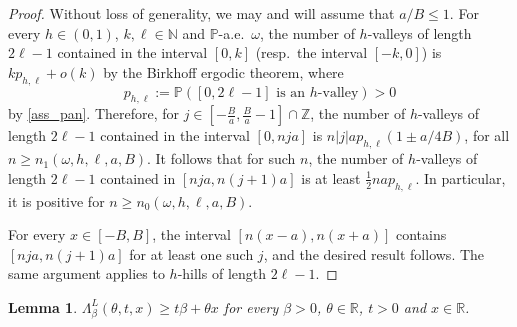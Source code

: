 \documentclass[a4paper]{amsart}
\numberwithin{equation}{section}
\theoremstyle{plain}
\newtheorem{lemma}[theorem]{\sc Lemma}
\theoremstyle{remark}
\begin{document}
\begin{proof}
  {}{Without loss of generality, we may and will assume that $a/B\leq 1$.}
  For every $h\in(0,1)$, $k,\ell\in\mathbb{N}$ and $\mathbb{P}$-a.e.\ $\omega$, the number of $h$-valleys of length $2\ell - 1$ contained in the interval $[0,k]$ (resp.\ the interval $[-k,0]$) is $kp_{h,\ell} + o(k)$
by the Birkhoff ergodic theorem, where
$$p_{h,\ell} := \mathbb{P}(\text{$[0,2\ell-1]$ is an $h$-valley})>0$$
by \eqref{ass_pan}. Therefore, for 
{}{$j\in[-\frac{B}{a},\frac{B}{a}-1]\cap\mathbb{Z}$},  
  the number of $h$-valleys of length $2\ell-1$ contained in the interval 
  {}{$[0,nja]$ is $n|j|ap_{h,\ell}(1\pm  a/4B)$, 
  for all $n\geq n_1(\omega,h,\ell,a,B)$. 
    It follows that for such $n$, the number of $h$-valleys of
    length $2\ell-1$ contained in $[nja,n(j+1)a]$ is 
    at least $\frac12 nap_{h,\ell}$.
  In particular, it is positive for $n\geq n_0(\omega,h,\ell,a,B)$.} 
  
  For every $x\in[-B,B]$, the interval $[n(x-a),n(x+a)]$ contains 
  $[nja,n(j+1)a]$ for at least one such $j$, and the desired result follows. The same argument applies to $h$-hills of length $2\ell-1$.
\end{proof}

\begin{lemma}\label{kendiyag}
$\Lambda_\beta^L(\theta,t,x) \ge t\beta + \theta x$ for every $\beta>0$, $\theta\in\mathbb{R}$, $t>0$ and $x\in\mathbb{R}$. 
\end{lemma}
\end{document}

